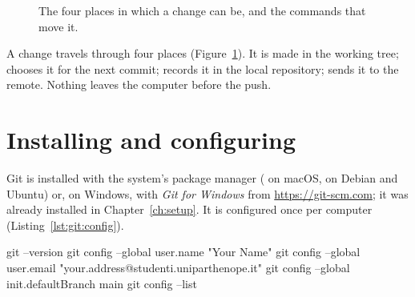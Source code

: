 \begin{figure}[htb]
\centering
{}
\caption{The four places in which a change can be, and the commands that move it.}
\label{fig:git:areas}
\end{figure}

A change travels through four places (Figure~\ref{fig:git:areas}). It is
made in the working tree;  chooses it for the next commit;
 records it in the local repository;  sends
it to the remote. Nothing leaves the computer before the push.

\section{Installing and configuring}

Git is installed with the system's package manager (
on macOS,  on Debian and Ubuntu) or, on Windows,
with \emph{Git for Windows} from \url{https://git-scm.com}; it was already
installed in Chapter~\ref{ch:setup}. It is configured once per computer
(Listing~\ref{lst:git:config}).

\begin{shell}[caption={Configuring Git, once.},label=lst:git:config]
git --version
git config --global user.name  "Your Name"
git config --global user.email "your.address@studenti.uniparthenope.it"
git config --global init.defaultBranch main
git config --list
\end{shell}

